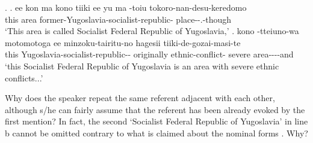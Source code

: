 %
\ex.\label{WO:TopicAppearClause-Initially:Ex:Yuugo}
 \ag. ee kon ma kono tiiki ee yu ma -toiu tokoro-nan-desu-keredomo \\
 	   this area    former-Yugoslavia-socialist-republic- place--.-though \\
	`This area is called Socialist Federal Republic of Yugoslavia,'
 \bg. kono -tteiuno-wa motomotoga ee minzoku-tairitu-no hagesii tiiki-de-gozai-masi-te \\
 	this Yugoslavia-socialist-republic-- originally  ethnic-conflict- severe area----and \\
	`this Socialist Federal Republic of Yugoslavia is an area with severe ethnic conflicts...'

Why does the speaker repeat the same referent adjacent with each other,
although s/he can fairly assume that the referent has been already evoked by the first mention?
In fact, the second `Socialist Federal Republic of Yugoslavia' in line b cannot be omitted contrary to what is claimed about the nominal forms \cite{givon83,gundeletal93,ariel90}.
Why?

